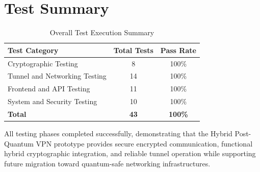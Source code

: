 \section{Test Summary}

\begin{table}[H]
\centering
\begin{tabular}{|l|c|c|}
\hline
\textbf{Test Category} & \textbf{Total Tests} & \textbf{Pass Rate} \\ \hline
Cryptographic Testing & 8 & 100\% \\ \hline
Tunnel and Networking Testing & 14 & 100\% \\ \hline
Frontend and API Testing & 11 & 100\% \\ \hline
System and Security Testing & 10 & 100\% \\ \hline
\textbf{Total} & \textbf{43} & \textbf{100\%} \\ \hline
\end{tabular}
\caption{Overall Test Execution Summary}
\end{table}

All testing phases completed successfully, demonstrating that the Hybrid Post-Quantum VPN prototype provides secure encrypted communication, functional hybrid cryptographic integration, and reliable tunnel operation while supporting future migration toward quantum-safe networking infrastructures.